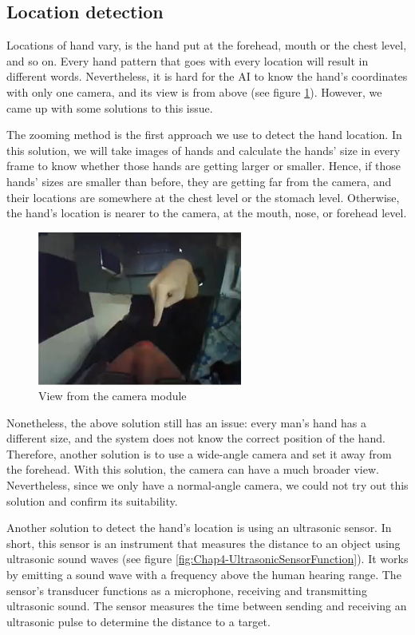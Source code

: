 \subsection{Location detection}

Locations of hand vary, is the hand put at the forehead, mouth or the chest level, and so on. Every hand pattern that goes with every location will result in different words. Nevertheless, it is hard for the AI to know the hand's coordinates with only one camera, and its view is from above (see figure \ref{fig:Chap4-ViewFromCamera}). However, we came up with some solutions to this issue.

The zooming method is the first approach we use to detect the hand location. In this solution, we will take images of hands and calculate the hands' size in every frame to know whether those hands are getting larger or smaller. Hence, if those hands' sizes are smaller than before, they are getting far from the camera, and their locations are somewhere at the chest level or the stomach level. Otherwise, the hand's location is nearer to the camera, at the mouth, nose, or forehead level.

\begin{figure}[H]
	\centering
	\includegraphics[width=0.6\textwidth]{img/Chap4/ViewFromCamera.png}
	\caption{View from the camera module}
	\label{fig:Chap4-ViewFromCamera}
\end{figure}

Nonetheless, the above solution still has an issue: every man's hand has a different size, and the system does not know the correct position of the hand. Therefore, another solution is to use a wide-angle camera and set it away from the forehead. With this solution, the camera can have a much broader view. Nevertheless, since we only have a normal-angle camera, we could not try out this solution and confirm its suitability.

Another solution to detect the hand's location is using an ultrasonic sensor. In short, this sensor is an instrument that measures the distance to an object using ultrasonic sound waves (see figure \ref{fig:Chap4-UltrasonicSensorFunction}). It works by emitting a sound wave with a frequency above the human hearing range. The sensor's transducer functions as a microphone, receiving and transmitting ultrasonic sound. The sensor measures the time between sending and receiving an ultrasonic pulse to determine the distance to a target.


